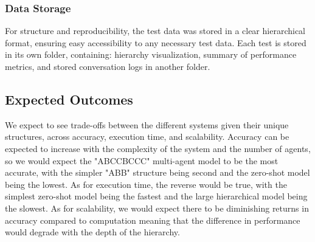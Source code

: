 \subsubsection{Data Storage}
For structure and reproducibility, the test data was stored in a clear hierarchical format, ensuring easy accessibility to any necessary test data. Each test is stored in its own folder, containing: hierarchy visualization, summary of performance metrics, and stored conversation logs in another folder.

\subsection{Expected Outcomes}
We expect to see trade-offs between the different systems given their unique structures, across accuracy, execution time, and scalability. Accuracy can be expected to increase with the complexity of the system and the number of agents, so we would expect the "ABCCBCCC" multi-agent model to be the most accurate, with the simpler "ABB" structure being second and the zero-shot model being the lowest. As for execution time, the reverse would be true, with the simplest zero-shot model being the fastest and the large hierarchical model being the slowest. As for scalability, we would expect there to be diminishing returns in accuracy compared to computation meaning that the difference in performance would degrade with the depth of the hierarchy.